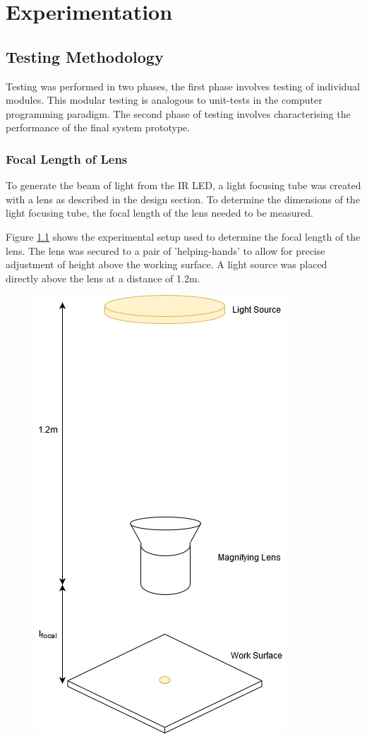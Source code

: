 \chapter{Experimentation}
\label{ch_experimentation}

\section{Testing Methodology}

Testing was performed in two phases, the first phase involves testing of individual modules. This modular testing is analogous to unit-tests in the computer programming paradigm. The second phase of testing involves characterising the performance of the final system prototype.

\subsection{Focal Length of Lens}
\label{exp:focal_length}
To generate the beam of light from the IR LED, a light focusing tube was created with a lens as described in the design section. To determine the dimensions of the light focusing tube, the focal length of the lens needed to be measured.

Figure \ref{fig:focal_length_experiemnt} shows the experimental setup used to determine the focal length of the lens. The lens was secured to a pair of 'helping-hands' to allow for precise adjustment of height above the working surface. A light source was placed directly above the lens at a distance of 1.2m.

\begin{figure}[H]
		\centering
		\includegraphics[width=.4\linewidth]{figures/experimentation/focal_length.png}
		\label{fig:focal_length_experiemnt}
\end{figure}

